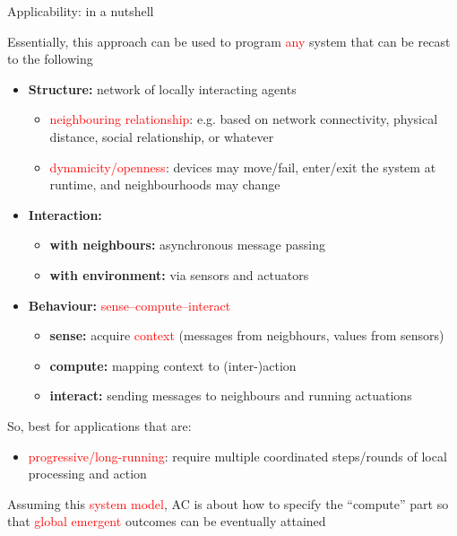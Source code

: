 \documentclass[presentation, 9pt]{beamer}\mode<presentation>{\usetheme{AMSBolognaFC}}
\newcommand{\lbl}[1]{\textbf{\textcolor{gray!90!white}{#1}}}
\newcommand{\enf}[1]{{\textcolor{red}{#1}}}
\begin{document}
\begin{frame}[fragile]{Applicability: in a nutshell}

Essentially, this approach can be used to program \enf{any} system that can be recast to the following

\begin{itemize}
\item \lbl{Structure:} network of locally interacting agents
	\begin{itemize}
	\item \enf{neighbouring relationship}: e.g. based on network connectivity, physical distance, social relationship, or whatever
	\item \enf{dynamicity/openness}: devices may move/fail, enter/exit the system at runtime, and neighbourhoods may change
	\end{itemize}
\item \lbl{Interaction:} 
	\begin{itemize}
	\item \lbl{with neighbours:} asynchronous message passing
	\item \lbl{with environment:} via sensors and actuators
	\end{itemize}
\item \lbl{Behaviour:} \enf{sense--compute--interact}
	\begin{itemize}
	\item \lbl{sense:} acquire \enf{context} (messages from neigbhours, values from sensors)
	\item \lbl{compute:} mapping context to (inter-)action
	\item \lbl{interact:} sending messages to neighbours and running actuations
	\end{itemize}
\end{itemize}

So, best for applications that are:
\begin{itemize}
\item \enf{progressive/long-running}: require multiple coordinated steps/rounds of local processing and action
\end{itemize}

Assuming this \enf{system model}, AC is about how to specify the ``compute'' part so that \enf{global emergent} outcomes can be eventually attained 

\end{frame}
\end{document}

